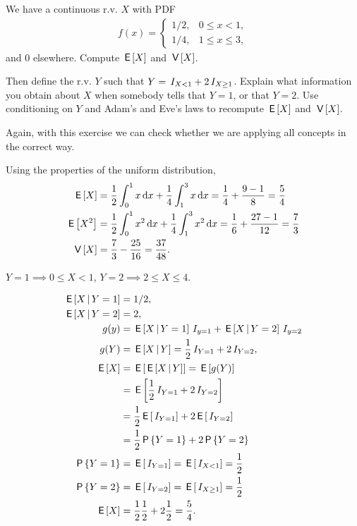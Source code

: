 \begin{exercise}
We have a continuous r.v. $X$ with PDF
\begin{align}
  \label{eq:23}
  f(x) =
  \begin{cases}
    1/2, & 0\leq x < 1, \\
    1/4, & 1\leq x \leq 3,
  \end{cases}
\end{align}
and $0$ elsewhere. Compute $\,\mathsf{E}\left[X\right]$ and $\,\mathsf{V}\left[X\right]$.

Then define the r.v.
$Y$ such that $Y=\,I_{X< 1} + 2\,I_{X\geq 1}$.
Explain what information you obtain about $X$ when somebody tells that $Y=1$, or that $Y=2$.
Use conditioning on $Y$ and Adam's and Eve's laws to recompute $\,\mathsf{E}\left[X\right]$ and $\,\mathsf{V}\left[X\right]$.

Again, with this exercise we can check whether we are applying all concepts in the correct way.
\begin{solution}

Using the properties of the uniform distribution,
\begin{align}
  \label{}
\,\mathsf{E}\left[X\right] &= \frac{1}{2} \int_0^1 x \,\textrm{d}x + \frac{1}{4} \int_1^3 x \,\textrm{d}x = \frac{1}{4} + \frac{9-1}{8} = \frac{5}{4} \\
\,\mathsf{E}\left[X^2\right] &=  \frac{1}{2}\int_0^{1} x^{2}\,\textrm{d}x + \frac{1}{4}\int_1^{3} x^{2}\,\textrm{d}x = \frac{1}{6} + \frac{27-1}{12} = \frac{7}{3} \\
\,\mathsf{V}\left[X\right] &=  \frac{7}{3} - \frac{25}{16} = \frac{37}{48}.
\end{align}

$Y=1 \implies 0\leq X< 1$,  $Y=2 \implies 2\leq X \leq 4$.

\begin{align}
  \label{}
\,\mathsf{E}\left[X\,\middle|\, Y=1\right] &= 1/2, \\
\,\mathsf{E}\left[X\,\middle|\, Y=2\right] &= 2, \\
g(y) &= \,\mathsf{E}\left[X\,\middle|\, Y=1\right]\,I_{y=1} + \,\mathsf{E}\left[X\,\middle|\, Y=2\right]\,I_{y=2}\\
g(Y) &= \,\mathsf{E}\left[X \,\middle|\, Y\right] = \frac{1}{2} \,I_{Y=1} + 2 \,I_{Y=2},\\
\,\mathsf{E}\left[X\right] &= \,\mathsf{E}\left[\,\mathsf{E}\left[X\,\middle|\, Y\right]\right] = \,\mathsf{E}\left[g(Y)\right] \\
&=\,\mathsf{E}\left[\frac{1}{2} \,I_{Y=1} + 2 \,I_{Y=2}\right] \\
&= \frac{1}{2} \,\mathsf{E}\left[\,I_{Y=1}\right] + 2 \,\mathsf{E}\left[\,I_{Y=2}\right] \\
&= \frac{1}{2} \,\mathsf{P}\left\{Y=1\right\} + 2 \,\mathsf{P}\left\{Y=2\right\} \\
\,\mathsf{P}\left\{Y=1\right\} &= \,\mathsf{E}\left[\,I_{Y=1}\right] = \,\mathsf{E}\left[\,I_{X<1}\right] = \frac{1}{2} \\
\,\mathsf{P}\left\{Y=2\right\} &= \,\mathsf{E}\left[\,I_{Y=2}\right] = \,\mathsf{E}\left[\,I_{X\geq 1}\right] = \frac{1}{2} \\
\,\mathsf{E}\left[X\right] &= \frac{1}{2} \frac{1}{2} + 2 \frac{1}{2} = \frac{5}{4}.
\end{align}



\end{solution}
\end{exercise}
